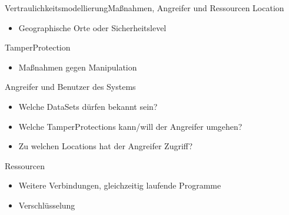 \documentclass{sdqbeamer}
\begin{document}

\begin{frame}{Vertraulichkeitsmodellierung}{Maßnahmen, Angreifer und Ressourcen}
		Location
		\begin{itemize}
			\item Geographische Orte oder Sicherheitslevel
		\end{itemize}
		\vspace{0.05\textheight}
		TamperProtection
		\begin{itemize}
			\item Maßnahmen gegen Manipulation
		\end{itemize}
	\vspace{0.05\textheight}
	Angreifer und Benutzer des Systems
	\begin{itemize}
		\item Welche DataSets dürfen bekannt sein?
		\item Welche TamperProtections kann/will der Angreifer umgehen?
		\item Zu welchen Locations hat der Angreifer Zugriff?
	\end{itemize}
	\vspace{0.05\textheight}
	Ressourcen
	\begin{itemize}
		\item Weitere Verbindungen, gleichzeitig laufende Programme
		\item Verschlüsselung
	\end{itemize}
\end{frame}	
\end{document}
